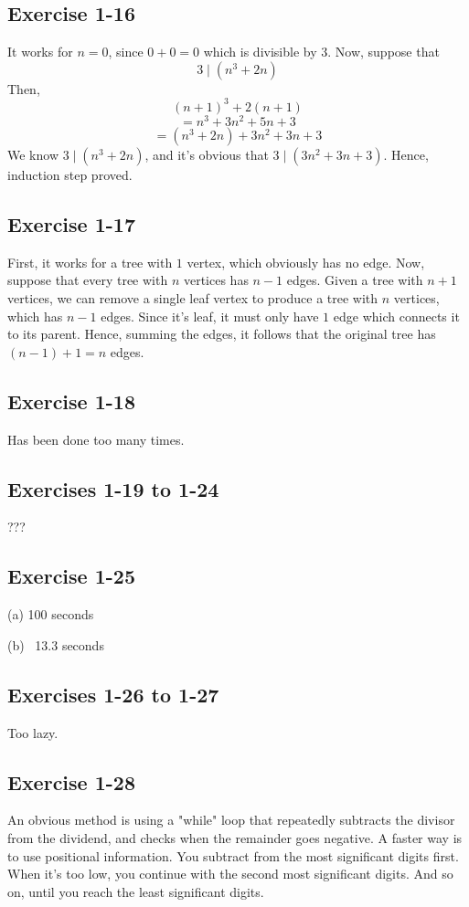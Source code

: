 \documentclass{book}
\begin{document}
\subsection*{Exercise 1-16}
It works for $n = 0$, since $0 + 0 = 0$ which is divisible by $3$. Now, suppose that
$$3 \mid (n^3 + 2n)$$
Then,
$$(n + 1)^3 + 2(n + 1)$$
$$= n^3 + 3n^2 + 5n + 3$$
$$= (n^3 + 2n) + 3n^2 + 3n + 3$$
We know $3 \mid (n^3 + 2n)$, and it's obvious that $3 \mid (3n^2 + 3n + 3)$. Hence, induction step proved.

\subsection*{Exercise 1-17}
First, it works for a tree with $1$ vertex, which obviously has no edge. Now, suppose that every tree with $n$ vertices has $n - 1$ edges. Given a tree with $n + 1$ vertices, we can remove a single leaf vertex to produce a tree with $n$ vertices, which has $n - 1$ edges. Since it's leaf, it must only have $1$ edge which connects it to its parent. Hence, summing the edges, it follows that the original tree has $(n - 1) + 1 = n$ edges.

\subsection*{Exercise 1-18}
Has been done too many times.

\subsection*{Exercises 1-19 to 1-24}
???

\subsection*{Exercise 1-25}
(a) 100 seconds

\noindent
(b) ~13.3 seconds

\subsection*{Exercises 1-26 to 1-27}
Too lazy.

\subsection*{Exercise 1-28}
An obvious method is using a "while" loop that repeatedly subtracts the divisor from the dividend, and checks when the remainder goes negative. A faster way is to use positional information. You subtract from the most significant digits first. When it's too low, you continue with the second most significant digits. And so on, until you reach the least significant digits.
\end{document}

